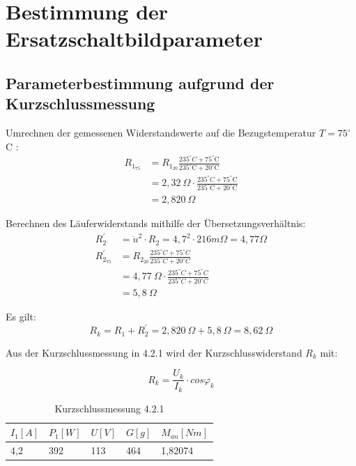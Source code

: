 \documentclass[conference]{IEEEtran}
\begin{document}
\section{Bestimmung der Ersatzschaltbildparameter}
\subsection{Parameterbestimmung aufgrund der Kurzschlussmessung}

Umrechnen der gemessenen Widerstandswerte auf die Bezugstemperatur $T=75^\circ$C :
\begin{align}
    R_{1_{75}} & = R_{1_{20}}\frac{235^\circ\si{C}+75^\circ\text{C}}{235^\circ\text{C}+20^\circ\text{C}}         \\
               & = 2,32\ \Omega\cdot \frac{235^\circ\si{C}+75^\circ\text{C}}{235^\circ\text{C}+20^\circ\text{C}} \\
    \label{eq:R1_75}
               & = 2,820\ \Omega
\end{align}

Berechnen des Läuferwiderstands mithilfe der Übersetzungsverhältnis:
\begin{align}
    R_2^\prime        & = \ddot{u}^2\cdot R_2 = 4,7^2 \cdot 216\si{m\Omega}   = 4,77 \Omega                       \\
    R_{2_{75}}^\prime & = R_{2_{20}}\frac{235^\circ\si{C}+75^\circ\si{C}}{235^\circ\si{C}+20^\circ\si{C}}         \\
                      & = 4,77\ \Omega\cdot \frac{235^\circ\si{C}+75^\circ\si{C}}{235^\circ\si{C}+20^\circ\si{C}} \\
    \label{eq:R_2^prime}
                      & = 5,8\ \Omega
\end{align}

Es gilt:
\begin{equation} \label{eq:Kurzschlusswiderstand_gemessen}
    \boxed{R_k = R_1 + R_2^\prime = 2,820\ \Omega + 5,8\ \Omega = 8,62\ \Omega}
\end{equation}

Aus der Kurzschlussmessung in 4.2.1 wird der Kurzschlusswiderstand $R_k$ mit:

\begin{equation} \label{eq:Kurzschlusswiderstand}
    \boxed{R_k = \frac{U_k}{I_k}\cdot cos\varphi_k}
\end{equation}

\begin{table}[htbp]
    \begin{tabularx}{\columnwidth}{XXXXX}
        \toprule
        $I_1[A]$ & $P_1[W]$ & $U[V]$ & $G[g]$ & $M_{an}[Nm]$ \\
        \midrule
        4,2      & 392      & 113    & 464    & 1,82074      \\
        \bottomrule
    \end{tabularx}
    \caption{Kurzschlussmessung 4.2.1}
    \label{tab:Kurzschlussmessung}
\end{table}
\end{document}
